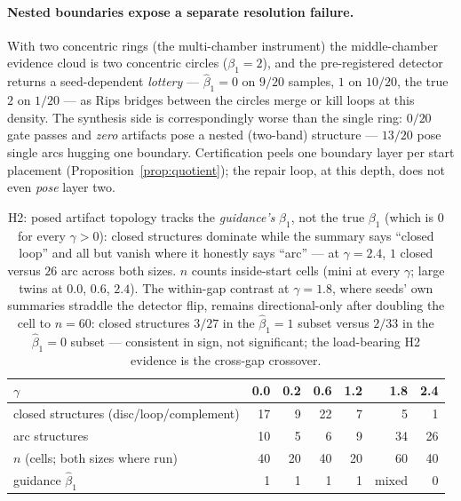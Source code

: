\documentclass[11pt]{article}
\theoremstyle{remark}
\begin{document}
\paragraph{Nested boundaries expose a separate resolution failure.}
With two concentric rings (the
multi-chamber instrument) the middle-chamber evidence cloud is two
concentric circles ($\beta_1 = 2$), and the pre-registered detector
returns a seed-dependent \emph{lottery} --- $\hat\beta_1 = 0$ on $9/20$
samples, $1$ on $10/20$, the true $2$ on $1/20$ --- as Rips bridges between
the circles merge or kill loops at this density. The synthesis side is
correspondingly worse than the single ring: $0/20$ gate passes and
\emph{zero} artifacts pose a nested (two-band) structure --- $13/20$ pose
single arcs hugging one boundary. Certification peels one boundary layer
per start placement (Proposition~\ref{prop:quotient}); the repair loop, at
this depth, does not even \emph{pose} layer two.

\begin{table}[h]
\centering
\small
\begin{tabular}{lrrrrrr}
\toprule
$\gamma$ & 0.0 & 0.2 & 0.6 & 1.2 & 1.8 & 2.4 \\
\midrule
closed structures (disc/loop/complement) & 17 & 9 & 22 & 7 & 5 & 1 \\
arc structures & 10 & 5 & 6 & 9 & 34 & 26 \\
$n$ (cells; both sizes where run) & 40 & 20 & 40 & 20 & 60 & 40 \\
guidance $\hat\beta_1$ & 1 & 1 & 1 & 1 & mixed & 0 \\
\bottomrule
\end{tabular}
\caption{H2: posed artifact topology tracks the \emph{guidance's}
$\hat\beta_1$, not the true $\beta_1$ (which is $0$ for every
$\gamma > 0$): closed structures dominate while the summary says ``closed
loop'' and all but vanish where it honestly says ``arc'' --- at
$\gamma = 2.4$, $1$ closed versus $26$ arc across both sizes. $n$ counts inside-start cells
(mini at every $\gamma$; large twins at $0.0$, $0.6$, $2.4$). The
within-gap contrast at $\gamma = 1.8$, where seeds' own summaries straddle
the detector flip, remains directional-only after doubling the cell to
$n = 60$: closed structures $3/27$ in the $\hat\beta_1 = 1$ subset versus
$2/33$ in the $\hat\beta_1 = 0$ subset --- consistent in sign, not
significant; the load-bearing H2 evidence is the cross-gap crossover.}
\label{tab:sensor}
\end{table}
\end{document}

